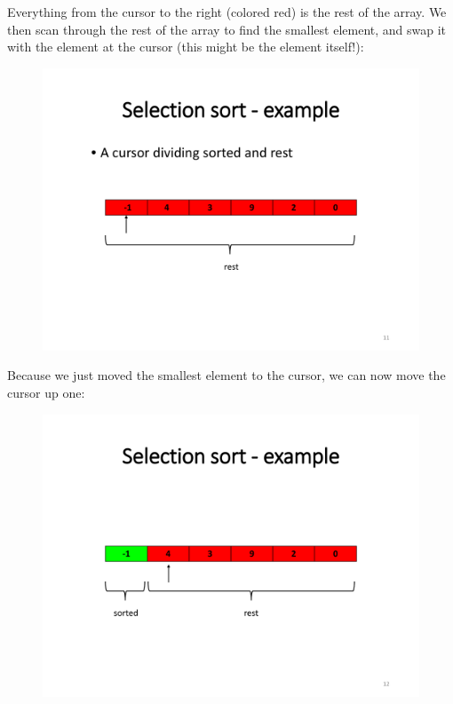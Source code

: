 \documentclass{article}
\begin{document}
\begin{flushleft}
Everything from the cursor to the right (colored red) is the rest of the array. We then scan
through the rest of the array to find the smallest element, and swap it with the element at the
cursor (this might be the element itself!):

\begin{figure}[H]
\centering
\includegraphics[scale=0.5]{Fig1_1}
\end{figure}

Because we just moved the smallest element to the cursor, we can now move the cursor up
one:

\begin{figure}[H]
\centering
\includegraphics[scale=0.5]{Fig2}
\end{figure}


\end{flushleft}
\end{document}
